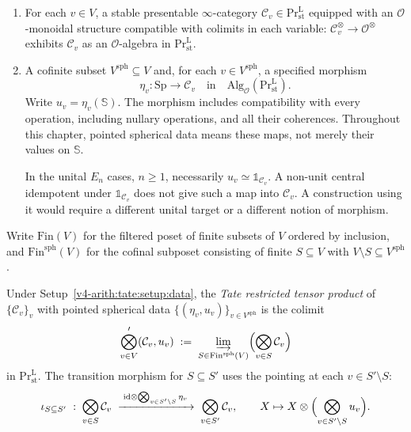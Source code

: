 \begin{setup}[F2.c data]
\label{v4-arith:tate:setup:data}
\leavevmode
\begin{enumerate}
\item[(D1)] For each \(v\in V\), a stable presentable \(\infty\)-category
\(\mathcal{C}_{v}\in\mathrm{Pr}^{\mathrm{L}}_{\mathrm{st}}\) equipped
with an \(\mathcal{O}\)-monoidal structure compatible with colimits in
each variable: \(\mathcal{C}_{v}^{\otimes}\to\mathcal{O}^{\otimes}\)
exhibits \(\mathcal{C}_{v}\) as an \(\mathcal{O}\)-algebra in
\(\mathrm{Pr}^{\mathrm{L}}_{\mathrm{st}}\).
\item[(D2)] A cofinite subset \(V^{\mathrm{sph}}\subseteq V\) and,
for each \(v\in V^{\mathrm{sph}}\), a specified morphism
\[
 \eta_v:\mathrm{Sp}\longrightarrow\mathcal C_v
 \quad\text{in}\quad
 \mathrm{Alg}_{\mathcal O}(\mathrm{Pr}^{\mathrm L}_{\mathrm{st}}).
\]
Write \(u_v=\eta_v(\mathbb S)\). The morphism includes compatibility
with every operation, including nullary operations, and all their
coherences. Throughout this chapter, pointed spherical data means
these maps, not merely their values on \(\mathbb S\).

In the unital
\(E_n\) cases, \(n\geq1\), necessarily
\(u_v\simeq\mathbb 1_{\mathcal C_v}\). A non-unit central idempotent
under \(\mathbb 1_{\mathcal C_v}\) does not give such a map into
\(\mathcal C_v\). A construction using it would require a different
unital target or a different notion of morphism.
\end{enumerate}
Write \(\mathrm{Fin}(V)\) for the filtered poset of finite subsets of
\(V\) ordered by inclusion, and \(\mathrm{Fin}^{\mathrm{sph}}(V)\) for
the cofinal subposet consisting of finite \(S\subseteq V\) with
\(V\setminus S\subseteq V^{\mathrm{sph}}\).
\end{setup}

\begin{definition}
\label{v4-arith:tate:def:restricted-tensor}
Under Setup~\ref{v4-arith:tate:setup:data}, the \emph{Tate restricted
tensor product} of \(\{\mathcal{C}_{v}\}_{v}\) with pointed spherical
data \(\{(\eta_{v},u_{v})\}_{v\in V^{\mathrm{sph}}}\) is the colimit
\begin{equation}
\label{v4-arith:tate:eq:restricted-def}
\bigotimes_{v\in V}^{\prime}(\mathcal{C}_{v},u_{v})
\;:=\;
\varinjlim_{S\in\mathrm{Fin}^{\mathrm{sph}}(V)}
\Bigl(\bigotimes_{v\in S}\mathcal{C}_{v}\Bigr)
\end{equation}
in \(\mathrm{Pr}^{\mathrm{L}}_{\mathrm{st}}\). The transition
morphism for \(S\subseteq S'\) uses the pointing at each
\(v\in S'\setminus S\):
\begin{equation}
\label{v4-arith:tate:eq:unital-extension}
\iota_{S\subseteq S'}\;:\;
\bigotimes_{v\in S}\mathcal{C}_{v}
\;\xrightarrow{\;\mathrm{id}\otimes\bigotimes_{v\in S'\setminus S} \eta_{v}\;}\;
\bigotimes_{v\in S'}\mathcal{C}_{v},
\qquad
X\mapsto X\otimes\Bigl(\bigotimes_{v\in S'\setminus S}u_{v}\Bigr).
\end{equation}
\end{definition}

